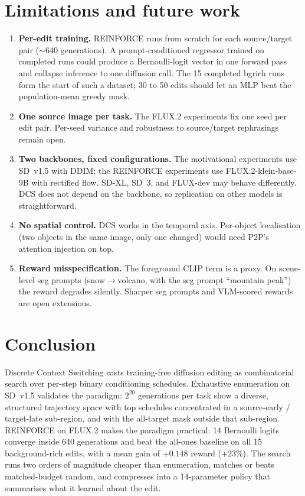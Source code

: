 \section{Limitations and future work}

\begin{enumerate}
    \item \textbf{Per-edit training.} REINFORCE runs from scratch for each source/target pair ($\sim 640$ generations). A prompt-conditioned regressor trained on completed runs could produce a Bernoulli-logit vector in one forward pass and collapse inference to one diffusion call. The 15 completed bgrich runs form the start of such a dataset; 30 to 50 edits should let an MLP beat the population-mean greedy mask.
    \item \textbf{One source image per task.} The FLUX.2 experiments fix one seed per edit pair. Per-seed variance and robustness to source/target rephrasings remain open.
    \item \textbf{Two backbones, fixed configurations.} The motivational experiments use SD~v1.5 with DDIM; the REINFORCE experiments use FLUX.2-klein-base-9B with rectified flow. SD-XL, SD~3, and FLUX-dev may behave differently. DCS does not depend on the backbone, so replication on other models is straightforward.
    \item \textbf{No spatial control.} DCS works in the temporal axis. Per-object localisation (two objects in the same image, only one changed) would need P2P's attention injection on top.
    \item \textbf{Reward misspecification.} The foreground CLIP term is a proxy. On scene-level seg prompts (snow$\to$volcano, with the seg prompt ``mountain peak'') the reward degrades silently. Sharper seg prompts and VLM-scored rewards are open extensions.
\end{enumerate}

\section{Conclusion}

Discrete Context Switching casts training-free diffusion editing as combinatorial search over per-step binary conditioning schedules. Exhaustive enumeration on SD~v1.5 validates the paradigm: $2^{20}$ generations per task show a diverse, structured trajectory space with top schedules concentrated in a source-early / target-late sub-region, and with the all-target mask outside that sub-region. REINFORCE on FLUX.2 makes the paradigm practical: 14 Bernoulli logits converge inside 640 generations and beat the all-ones baseline on all 15 background-rich edits, with a mean gain of $+0.148$ reward ($+23\%$). The search runs two orders of magnitude cheaper than enumeration, matches or beats matched-budget random, and compresses into a 14-parameter policy that summarises what it learned about the edit.
